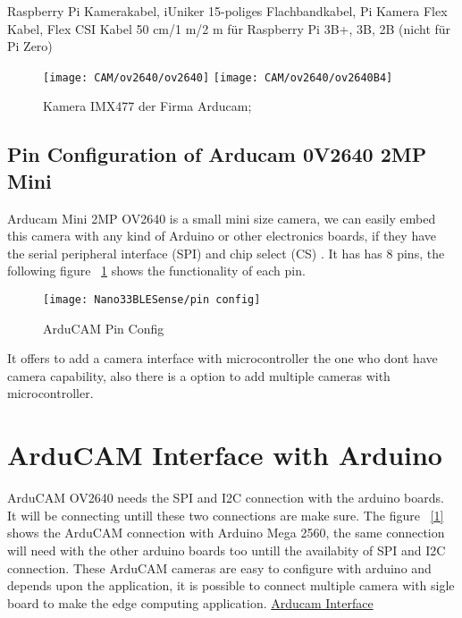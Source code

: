     
Raspberry Pi Kamerakabel, iUniker 15-poliges Flachbandkabel, Pi Kamera Flex Kabel, Flex CSI Kabel 50 cm/1 m/2 m für Raspberry Pi 3B+, 3B, 2B (nicht für Pi Zero)
    
\begin{figure}
    \begin{center}
        \texttt{[image: CAM/ov2640/ov2640]}
        \quad 
        \texttt{[image: CAM/ov2640/ov2640B4]}
        
        \caption{Kamera IMX477 der Firma Arducam; \cite{Arducam:2021}}
    \end{center}    
\end{figure}




\subsection{Pin Configuration of Arducam 0V2640 2MP Mini}

Arducam Mini 2MP OV2640 is a small mini size camera, we can easily embed this camera with any kind of Arduino or other electronics boards, if they have the serial peripheral interface (SPI) and  chip select (CS) . It has has 8 pins, the following figure ~\ref{pin config} shows the functionality of each pin.

\begin{figure}[ht]
    \centering
    \texttt{[image: Nano33BLESense/pin config]}
    \caption{ArduCAM Pin Config}
    \label{pin config}
\end{figure}

It offers to add a camera interface with microcontroller the one who dont have camera capability, also there is a option to add multiple cameras with microcontroller.

\section{ArduCAM Interface with Arduino}

ArduCAM OV2640 needs the  SPI and I2C connection with the arduino boards. It will be connecting untill these two connections are make sure. The figure ~\ref{1} shows the ArduCAM connection with Arduino Mega 2560, the same connection will need with the other arduino boards too untill the availabity of  SPI and I2C connection. These ArduCAM cameras are easy to configure with arduino and depends upon the application, it is possible to connect multiple camera with sigle board to make the edge computing application. \href{https://www.arducam.com/product/arducam-2mp-spi-camera-b0067-arduino/}{Arducam Interface}


